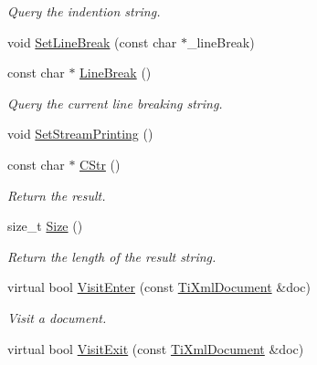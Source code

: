 \begin{DoxyCompactItemize}
\begin{DoxyCompactList}\small\item\em Query the indention string. \end{DoxyCompactList}\item 
void \hyperlink{class_ti_xml_printer_a4be1e37e69e3858c59635aa947174fe6}{Set\+Line\+Break} (const char $\ast$\+\_\+line\+Break)
\item 
\hypertarget{class_ti_xml_printer_a11f1b4804a460b175ec244eb5724d96d}{const char $\ast$ \hyperlink{class_ti_xml_printer_a11f1b4804a460b175ec244eb5724d96d}{Line\+Break} ()}\label{class_ti_xml_printer_a11f1b4804a460b175ec244eb5724d96d}

\begin{DoxyCompactList}\small\item\em Query the current line breaking string. \end{DoxyCompactList}\item 
void \hyperlink{class_ti_xml_printer_ab23a90629e374cb1cadca090468bbd19}{Set\+Stream\+Printing} ()
\item 
\hypertarget{class_ti_xml_printer_a859eede9597d3e0355b77757be48735e}{const char $\ast$ \hyperlink{class_ti_xml_printer_a859eede9597d3e0355b77757be48735e}{C\+Str} ()}\label{class_ti_xml_printer_a859eede9597d3e0355b77757be48735e}

\begin{DoxyCompactList}\small\item\em Return the result. \end{DoxyCompactList}\item 
\hypertarget{class_ti_xml_printer_ad01375ae9199bd2f48252eaddce3039d}{size\+\_\+t \hyperlink{class_ti_xml_printer_ad01375ae9199bd2f48252eaddce3039d}{Size} ()}\label{class_ti_xml_printer_ad01375ae9199bd2f48252eaddce3039d}

\begin{DoxyCompactList}\small\item\em Return the length of the result string. \end{DoxyCompactList}\item 
\hypertarget{class_ti_xml_printer_a799f4f0388570cbb54c0d3c345fef7c1}{virtual bool \hyperlink{class_ti_xml_printer_a799f4f0388570cbb54c0d3c345fef7c1}{Visit\+Enter} (const \hyperlink{class_ti_xml_document}{Ti\+Xml\+Document} \&doc)}\label{class_ti_xml_printer_a799f4f0388570cbb54c0d3c345fef7c1}

\begin{DoxyCompactList}\small\item\em Visit a document. \end{DoxyCompactList}\item 
\hypertarget{class_ti_xml_printer_a66b33edd76c538b462f789b797a4fdf2}{virtual bool \hyperlink{class_ti_xml_printer_a66b33edd76c538b462f789b797a4fdf2}{Visit\+Exit} (const \hyperlink{class_ti_xml_document}{Ti\+Xml\+Document} \&doc)}\label{class_ti_xml_printer_a66b33edd76c538b462f789b797a4fdf2}


\end{DoxyCompactItemize}
